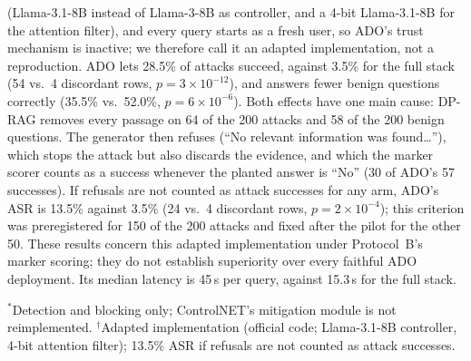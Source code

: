 \documentclass[conference]{IEEEtran}
\begin{document}
(Llama-3.1-8B instead of Llama-3-8B as controller, and a 4-bit Llama-3.1-8B for the attention filter), and every query starts as a fresh user, so ADO's trust mechanism is inactive; we therefore call it an adapted implementation, not a reproduction. ADO lets 28.5\% of attacks succeed, against 3.5\% for the full stack (54 vs.\ 4 discordant rows, $p=3\times10^{-12}$), and answers fewer benign questions correctly (35.5\% vs.\ 52.0\%, $p=6\times10^{-6}$). Both effects have one main cause: DP-RAG removes every passage on 64 of the 200 attacks and 58 of the 200 benign questions. The generator then refuses (``No relevant information was found\ldots''), which stops the attack but also discards the evidence, and which the marker scorer counts as a success whenever the planted answer is ``No'' (30 of ADO's 57 successes). If refusals are not counted as attack successes for any arm, ADO's ASR is 13.5\% against 3.5\% (24 vs.\ 4 discordant rows, $p=2\times10^{-4}$); this criterion was preregistered for 150 of the 200 attacks and fixed after the pilot for the other 50. These results concern this adapted implementation under Protocol~B's marker scoring; they do not establish superiority over every faithful ADO deployment. Its median latency is 45\,s per query, against 15.3\,s for the full stack.

\begin{table}[t]
\centering
\caption{Existing defenses on Protocol B: 200 planted attacks and 200 benign questions, same generator and scoring, paired by row. Wilson 95\% CIs; $p$ = exact McNemar test of attack success against the full stack.}
\label{tab:existing}
\setlength{\tabcolsep}{2.5pt}
\small
{}
{\footnotesize $^{*}$Detection and blocking only; ControlNET's mitigation module is not reimplemented. $^{\dagger}$Adapted implementation (official code; Llama-3.1-8B controller, 4-bit attention filter); 13.5\% ASR if refusals are not counted as attack successes.\par}
\end{table}
\end{document}
